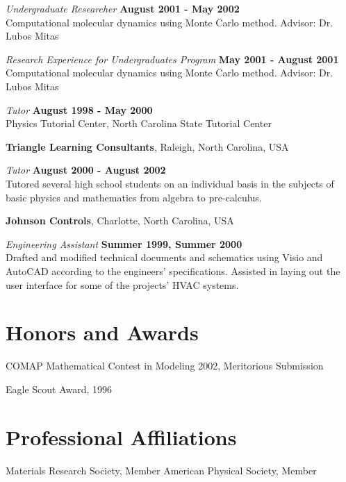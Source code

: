 \documentclass[letterpaper,margin,line]{res}
\begin{document}
\begin{resume}
{\em Undergraduate Researcher} \hfill {\bf August 2001 - May 2002}\\
Computational molecular dynamics using Monte Carlo method. Advisor: Dr. Lubos Mitas

{\em Research Experience for Undergraduates Program} \hfill {\bf May 2001 - August 2001}\\
Computational molecular dynamics using Monte Carlo method. Advisor: Dr. Lubos Mitas

{\em Tutor} \hfill {\bf August 1998 - May 2000}\\
Physics Tutorial Center, North Carolina State Tutorial Center

{\bf Triangle Learning Consultants}, Raleigh, North Carolina, USA

\vspace{-.3cm}
{\em Tutor} \hfill {\bf August 2000 - August 2002}\\
Tutored several high school students on an individual basis in the subjects of basic physics and mathematics from algebra to pre-calculus.



{\bf Johnson Controls}, Charlotte, North Carolina, USA

\vspace{-.3cm}
{\em Engineering Assistant} \hfill {\bf Summer 1999, Summer 2000}\\
Drafted and modified technical documents and schematics using Visio and AutoCAD according to the engineers' specifications. Assisted in laying out the user interface for some of the projects' HVAC systems.


\section{\sc Honors and Awards} 
COMAP Mathematical Contest in Modeling 2002, Meritorious Submission

\vspace*{-2.5mm}
Eagle Scout Award, 1996


\section{Professional Affiliations} 
Materials Research Society, Member
American Physical Society, Member


\end{resume}
\end{document}
